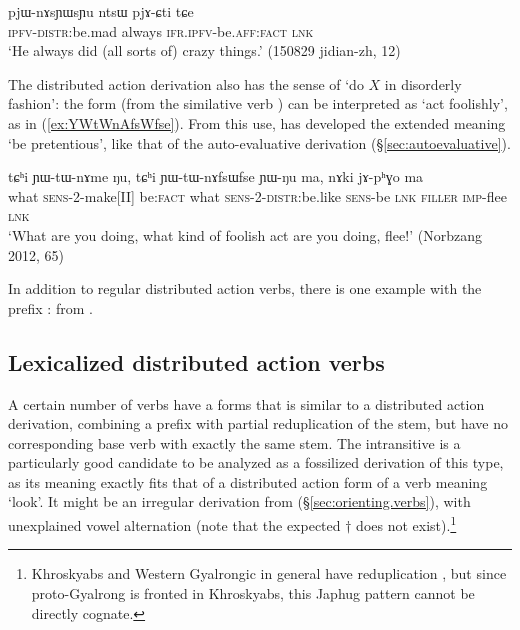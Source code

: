 \begin{exe}
\ex \label{ex:pjWnAsYWsYu}
\gll pjɯ-nɤsɲɯsɲu ntsɯ pjɤ-ɕti tɕe  \\
\textsc{ipfv}-\textsc{distr}:be.mad always \textsc{ifr}.\textsc{ipfv}-be.\textsc{aff}:\textsc{fact} \textsc{lnk} \\
\glt `He always did (all sorts of) crazy things.' (150829 jidian-zh, 12)
\end{exe}

The distributed action derivation also has the sense of `do $X$ in disorderly fashion': the form  (from the similative verb ) can be interpreted as `act foolishly', as in (\ref{ex:YWtWnAfsWfse}). From this use,  has developed the extended meaning `be pretentious', like that of the auto-evaluative derivation (§\ref{sec:autoevaluative}).

\begin{exe}
\ex \label{ex:YWtWnAfsWfse}
\gll tɕʰi ɲɯ-tɯ-nɤme ŋu, tɕʰi ɲɯ-tɯ-nɤfsɯfse ɲɯ-ŋu ma, nɤki jɤ-pʰɣo ma \\
what \textsc{sens}-2-make[II] be:\textsc{fact} what \textsc{sens}-2-\textsc{distr}:be.like \textsc{sens}-be \textsc{lnk} \textsc{filler} \textsc{imp}-flee \textsc{lnk} \\
\glt `What are you doing, what kind of foolish act are you doing, flee!' (Norbzang 2012, 65)
\end{exe}

In addition to regular distributed action verbs, there is one example with the prefix :  from .

\subsection{Lexicalized distributed action verbs} \label{sec:distributed.action.lexicalized} 
A certain number of verbs have a forms that is similar to a distributed action derivation, combining a  prefix with partial reduplication of the stem, but have no corresponding base verb with exactly the same stem. The intransitive  is a particularly good candidate to be analyzed as a fossilized derivation of this type, as its meaning exactly fits that of a distributed action form of a verb meaning `look'. It might be an irregular derivation from  (§\ref{sec:orienting.verbs}), with unexplained vowel alternation (note that the expected $\dagger$ does not exist).\footnote{Khroskyabs and Western Gyalrongic in general have   reduplication \citep{lai13fuyin}, but since proto-Gyalrong  is fronted in Khroskyabs, this Japhug pattern cannot be directly cognate.}

